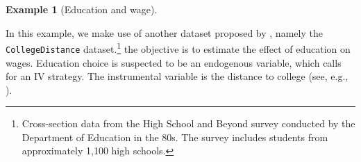 \documentclass[
  12pt,
]{book}
\newenvironment{Shaded}{\begin{snugshade}}{\end{snugshade}}
\newcommand{\AttributeTok}[1]{\textcolor[rgb]{0.13,0.29,0.53}{#1}}
\newcommand{\FloatTok}[1]{\textcolor[rgb]{0.00,0.00,0.81}{#1}}
\newcommand{\FunctionTok}[1]{\textcolor[rgb]{0.13,0.29,0.53}{\textbf{#1}}}
\newcommand{\NormalTok}[1]{#1}
\newcommand{\OtherTok}[1]{\textcolor[rgb]{0.56,0.35,0.01}{#1}}
\newcommand{\SpecialCharTok}[1]{\textcolor[rgb]{0.81,0.36,0.00}{\textbf{#1}}}
\newcommand{\StringTok}[1]{\textcolor[rgb]{0.31,0.60,0.02}{#1}}
\theoremstyle{definition}
\theoremstyle{definition}
\newtheorem{example}{Example}[chapter]
\theoremstyle{definition}
\theoremstyle{definition}
\theoremstyle{remark}
\begin{document}
\begin{example}[Education and wage]
\protect\hypertarget{exm:IVCollegeDistance}{}\label{exm:IVCollegeDistance}

In this example, we make use of another dataset proposed by \citet{Stock_Watson_2003}, namely the \texttt{CollegeDistance} dataset.\footnote{Cross-section data from the High School and Beyond survey conducted by the Department of Education in the 80s. The survey includes students from approximately 1,100 high schools.} the objective is to estimate the effect of education on wages. Education choice is suspected to be an endogenous variable, which calls for an IV strategy. The instrumental variable is the distance to college (see, e.g., \citet{DEE20041697}).

\begin{Shaded}
\end{Shaded}
\end{example}
\end{document}
